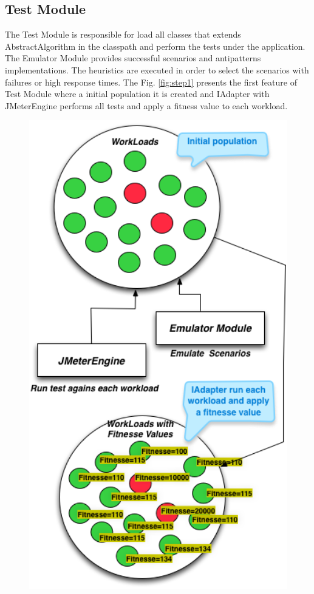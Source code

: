 \documentclass[times]{stvrauth}
\begin{document}
\subsection{Test Module}

The Test Module is responsible for load all classes that extends AbstractAlgorithm in the classpath and perform the tests under the application. The Emulator Module provides successful scenarios and antipatterns implementations. The heuristics are executed in order to select the scenarios with failures or high response times. The Fig. \ref{fig:step1} presents the first feature of Test Module where a initial population it is created and IAdapter with JMeterEngine performs all tests and apply a fitness value to each workload.

\begin{figure}[h]
\begin{minipage}{.5\textwidth}
\centering
\includegraphics[width=1\textwidth]{./images/step1.png}

\end{minipage}
\end{figure}
\end{document}

